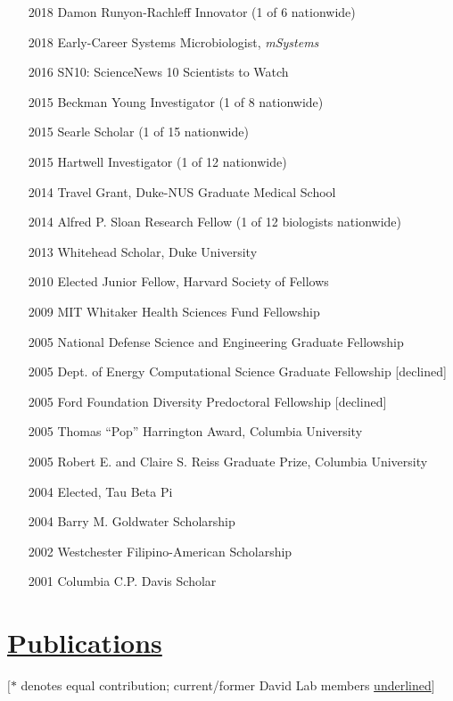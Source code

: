 \documentclass[overlapped,line,11pt]{res}
\begin{document}
\begin{resume}
\begin{itemize}[leftmargin=1cm, style=sameline, itemsep=0mm]
\item[2018] Damon Runyon-Rachleff Innovator (1 of 6 nationwide)
\item[2018] Early-Career Systems Microbiologist, \emph{mSystems}
\item[2016] SN10: ScienceNews 10 Scientists to Watch
\item[2015] Beckman Young Investigator (1 of 8 nationwide)
\item[2015] Searle Scholar (1 of 15 nationwide)
\item[2015] Hartwell Investigator (1 of 12 nationwide)
\item[2014] Travel Grant, Duke-NUS Graduate Medical School
\item[2014] Alfred P. Sloan Research Fellow (1 of 12 biologists nationwide)
\item[2013] Whitehead Scholar, Duke University%
\item[2010] Elected Junior Fellow, Harvard Society of Fellows%
\item[2009] MIT Whitaker Health Sciences Fund Fellowship %
\item[2005] National Defense Science and Engineering Graduate
  Fellowship
\item[2005] Dept. of Energy Computational Science Graduate Fellowship [declined]
\item[2005] Ford Foundation Diversity Predoctoral Fellowship [declined]
\item[2005] Thomas ``Pop'' Harrington Award, Columbia University
\item[2005] Robert E. and Claire S. Reiss Graduate Prize, Columbia University
\item[2004] Elected, Tau Beta Pi
\item[2004] Barry M. Goldwater Scholarship
\item[2002] Westchester Filipino-American Scholarship
\item[2001] Columbia C.P. Davis Scholar

\end{itemize}

\section{\underline{\sc Publications}} 
\vspace{.1in} $[\ast$ denotes equal contribution; current/former David
  Lab members \underline{underlined}$]$
\vspace{.1in}


\end{resume}
\end{document}
